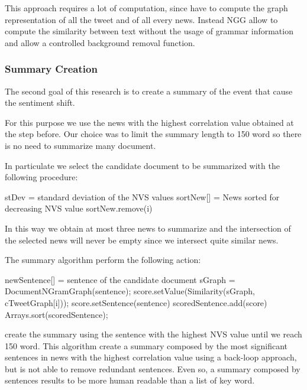 This approach requires a lot of computation, since have to compute the graph representation of all the tweet and of all every news. Instead NGG allow to compute the similarity between text without the usage of grammar information and allow a controlled background removal function.


\subsubsection*{Summary Creation}
The second goal of this research is to create a summary of the event that cause the sentiment shift. 

For this purpose we use the news with the highest correlation value obtained at the step before.
Our choice was to limit the summary length to 150 word so there is no need to summarize many document. 


In particulate we select the candidate document to be summarized with the following procedure:


\begin{algorithmic}
\STATE stDev = standard deviation of the NVS values
\STATE sortNew[] = News sorted for decreasing NVS value
		\STATE sortNew.remove(i)
	\ENDIF
\ENDFOR
\end{algorithmic}


In this way we obtain at most three news to summarize and the intersection of the selected news will never be empty since we intersect quite similar news.

The summary algorithm perform the following action:


\begin{algorithmic}
\STATE newSentence[] = sentence of the candidate document
	\STATE sGraph = DocumentNGramGraph(sentence);
    \STATE score.setValue(Similarity(sGraph, cTweetGraph[i]));
    \STATE score.setSentence(sentence)
    \STATE scoredSentence.add(score)
\ENDFOR
\STATE Arrays.sort(scoredSentence);
\end{algorithmic}

create the summary using the sentence with the highest NVS value until we reach 150 word.
This algorithm create a summary composed by the most significant sentences in news with the highest correlation value using a back-loop approach, but is not able to remove redundant sentences. Even so, a summary composed by sentences results to be more human readable than a list of key word.
